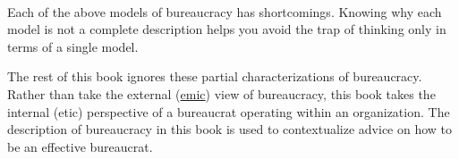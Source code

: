 \ \\

Each of the above models of bureaucracy has shortcomings. Knowing why each model is not a complete description helps you avoid the trap of thinking only in terms of a single model. 

The rest of this book ignores these partial characterizations of bureaucracy. 
Rather than take the external (\href{https://en.wikipedia.org/wiki/Emic_and_etic}{emic}) 
view of bureaucracy, this book takes the internal (etic) perspective of a bureaucrat operating within an organization. 
The description of bureaucracy in this book is used to contextualize advice on how to be an effective bureaucrat. 
